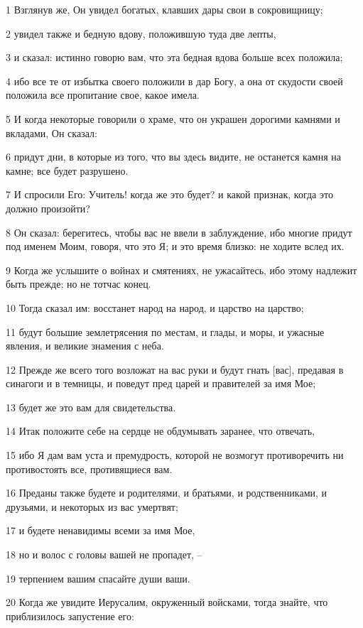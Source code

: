 \par 1 Взглянув же, Он увидел богатых, клавших дары свои в сокровищницу;
\par 2 увидел также и бедную вдову, положившую туда две лепты,
\par 3 и сказал: истинно говорю вам, что эта бедная вдова больше всех положила;
\par 4 ибо все те от избытка своего положили в дар Богу, а она от скудости своей положила все пропитание свое, какое имела.
\par 5 И когда некоторые говорили о храме, что он украшен дорогими камнями и вкладами, Он сказал:
\par 6 придут дни, в которые из того, что вы здесь видите, не останется камня на камне; все будет разрушено.
\par 7 И спросили Его: Учитель! когда же это будет? и какой признак, когда это должно произойти?
\par 8 Он сказал: берегитесь, чтобы вас не ввели в заблуждение, ибо многие придут под именем Моим, говоря, что это Я; и это время близко: не ходите вслед их.
\par 9 Когда же услышите о войнах и смятениях, не ужасайтесь, ибо этому надлежит быть прежде; но не тотчас конец.
\par 10 Тогда сказал им: восстанет народ на народ, и царство на царство;
\par 11 будут большие землетрясения по местам, и глады, и моры, и ужасные явления, и великие знамения с неба.
\par 12 Прежде же всего того возложат на вас руки и будут гнать [вас], предавая в синагоги и в темницы, и поведут пред царей и правителей за имя Мое;
\par 13 будет же это вам для свидетельства.
\par 14 Итак положите себе на сердце не обдумывать заранее, что отвечать,
\par 15 ибо Я дам вам уста и премудрость, которой не возмогут противоречить ни противостоять все, противящиеся вам.
\par 16 Преданы также будете и родителями, и братьями, и родственниками, и друзьями, и некоторых из вас умертвят;
\par 17 и будете ненавидимы всеми за имя Мое,
\par 18 но и волос с головы вашей не пропадет, --
\par 19 терпением вашим спасайте души ваши.
\par 20 Когда же увидите Иерусалим, окруженный войсками, тогда знайте, что приблизилось запустение его:
